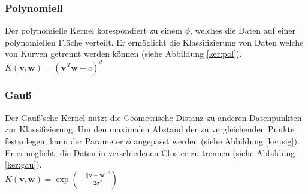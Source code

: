 \documentclass[10pt,a4paper]{scrartcl}
\begin{document}
                \subsubsection{Polynomiell}
                Der polynomielle Kernel korespondiert zu einem $\phi$, welches die Daten auf einer polynomiellen Fläche verteilt.
                Er ermöglicht die Klassifizierung von Daten welche von Kurven getrennt werden können (siehe Abbildung \ref{ker:pol}). \\
                $K(\boldsymbol{v}, \boldsymbol{w}) = (\boldsymbol{v}^{\, T} \boldsymbol{w} + c)^{d}$
                
                \subsubsection{Gauß}
                Der Gauß'sche Kernel nutzt die Geometrische Distanz zu anderen Datenpunkten zur Klassifizierung.
                Um den maximalen Abstand der zu vergleichenden Punkte festzulegen, kann der Parameter $\phi$ angepasst werden (siehe Abbildung \ref{ker:sig}). \\
                Er ermöglicht, die Daten in verschiedenen Cluster zu trennen (siehe Abbildung \ref{ker:gau}). \\
                $K(\boldsymbol{v}, \boldsymbol{w}) = \exp(-\frac{\lvert\lvert\boldsymbol{v} - \boldsymbol{w}\rvert\rvert^{2}}{2\sigma^{2}})$ \\\
                
\end{document}
